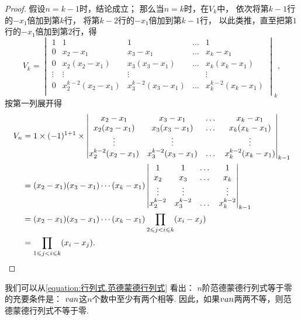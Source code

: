 \begin{example}
\begin{proof}
假设\(n=k-1\)时，结论成立；
那么当\(n=k\)时，在\(V_k\)中，
依次将第\(k-1\)行的\(-x_1\)倍加到第\(k\)行，
将第\(k-2\)行的\(-x_1\)倍加到第\(k-1\)行，
以此类推，直至把第\(1\)行的\(-x_1\)倍加到第\(2\)行，得\[
	V_k = \begin{vmatrix}
		1 & 1 & 1 & \dots & 1 \\
		0 & x_2 - x_1 & x_3 - x_1 & \dots & x_k - x_1 \\
		0 & x_2(x_2 - x_1) & x_3(x_3 - x_1) & \dots & x_k(x_k - x_1) \\
		\vdots & \vdots & \vdots & & \vdots \\
		0 & x_2^{k-2}(x_2 - x_1) & x_3^{k-2}(x_3 - x_1) & \dots & x_k^{k-2}(x_k - x_1) \\
	\end{vmatrix}_k,
\]
按第一列展开得\begin{align*}
	V_n &= 1 \times (-1)^{1+1} \times \begin{vmatrix}
		x_2 - x_1 & x_3 - x_1 & \dots & x_k - x_1 \\
		x_2(x_2 - x_1) & x_3(x_3 - x_1) & \dots & x_k(x_k - x_1) \\
		\vdots & \vdots & & \vdots \\
		x_2^{k-2}(x_2 - x_1) & x_3^{k-2}(x_3 - x_1) & \dots & x_k^{k-2}(x_k - x_1) \\
	\end{vmatrix}_{k-1} \\
	&= (x_2 - x_1)(x_3 - x_1)\dotsm(x_k - x_1) \begin{vmatrix}
		1 & 1 & \dots & 1 \\
		x_2 & x_3 & \dots & x_k \\
		\vdots & \vdots & & \vdots \\
		x_2^{k-2} & x_3^{k-2} & \dots & x_k^{k-2} \\
	\end{vmatrix}_{k-1} \\
	&= (x_2 - x_1)(x_3 - x_1)\dotsm(x_k - x_1)
		\prod\limits_{2 \leqslant j < i \leqslant k}(x_i - x_j) \\
	&= \prod\limits_{1 \leqslant j < i \leqslant k}(x_i - x_j).
	\qedhere
\end{align*}
\end{proof}
我们可以从\cref{equation:行列式.范德蒙德行列式} 看出：
\(n\)阶范德蒙德行列式等于零的充要条件是：
\(v{a}{n}\)这\(n\)个数中至少有两个相等.
因此，如果\(v{a}{n}\)两两不等，则范德蒙德行列式不等于零.
\end{example}

